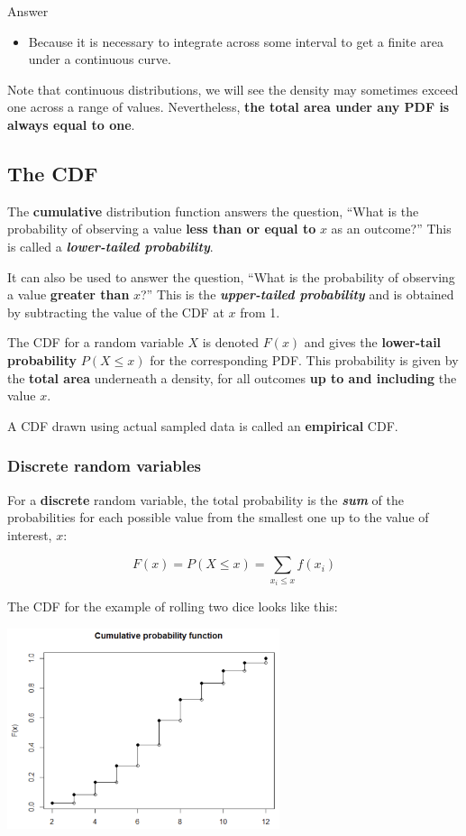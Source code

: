 \documentclass[
]{article}
\providecommand{\tightlist}{%
  \setlength{\itemsep}{0pt}\setlength{\parskip}{0pt}}
\begin{document}
Answer

\begin{itemize}
\tightlist
\item
  Because it is necessary to integrate across some interval to get a
  finite area under a continuous curve.
\end{itemize}

Note that continuous distributions, we will see the density may
sometimes exceed one across a range of values. Nevertheless, \textbf{the
total area under any PDF is always equal to one}.

\hypertarget{the-cdf}{%
\subsection{The CDF}\label{the-cdf}}

The \textbf{cumulative} distribution function answers the question,
``What is the probability of observing a value \textbf{less than or
equal to} \(x\) as an outcome?'' This is called a
\textbf{\emph{lower-tailed probability}}.

It can also be used to answer the question, ``What is the probability of
observing a value \textbf{greater than} \(x\)?'' This is the
\textbf{\emph{upper-tailed probability}} and is obtained by subtracting
the value of the CDF at \(x\) from 1.

The CDF for a random variable \(X\) is denoted \(F(x)\) and gives the
\textbf{lower-tail probability} \(P(X \le x)\) for the corresponding
PDF. This probability is given by the \textbf{total area} underneath a
density, for all outcomes \textbf{up to and including} the value \(x\).

A CDF drawn using actual sampled data is called an \textbf{empirical}
CDF.

\hypertarget{discrete-random-variables-1}{%
\subsubsection{Discrete random
variables}\label{discrete-random-variables-1}}

For a \textbf{discrete} random variable, the total probability is the
\textbf{\emph{sum}} of the probabilities for each possible value from
the smallest one up to the value of interest, \(x\):

\[ F(x) = P(X \le x) = \sum_{x_i \le x} f(x_i) \]

The CDF for the example of rolling two dice looks like this:

\includegraphics[width=0.6\textwidth,height=\textheight]{Images/cdf_dice.png}
\end{document}
